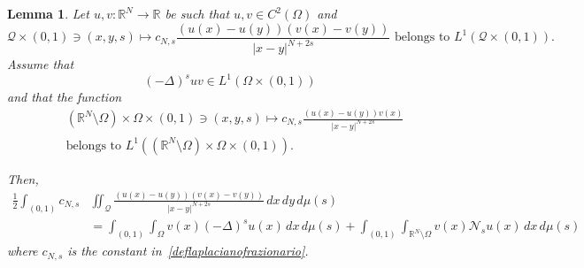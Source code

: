 \documentclass[12pt,a4paper,intlimits,sumlimits]{amsart}
\def \R {\mathbb{R}}
\def \Ns {\mathscr{N}_{s}}
\def \Q {\mathcal Q}
\theoremstyle{definition}
\theoremstyle{plain}
\newtheorem{lemma}[definition]{Lemma}
\numberwithin{equation}{section}
\begin{document}
\begin{lemma}\label{lemmaperparti}
Let $u,v:\R^N\to \R$ be such that
$u,v\in C^2(\Omega)$ and
\begin{equation}\label{ipotesiperparti1}
\Q\times(0,1)\ni (x,y,s) \mapsto 
c_{N,s}\frac{(u(x)-u(y))(v(x)-v(y))}{|x-y|^{N+2s}}
\mbox{ belongs to } L^1(\Q\times(0,1)).
\end{equation}
Assume that
\begin{equation}\label{ipotesiperparti2}
(-\Delta)^su v\in L^1(\Omega\times (0,1))
\end{equation}
and that the function
\begin{equation}\label{ipotesiperparti3}\begin{split}
&(\R^N\setminus \Omega)\times \Omega \times (0,1)\ni (x,y,s)
\mapsto c_{N,s}\frac{(u(x)-u(y))v(x)}{|x-y|^{N+2s}}\\&
\mbox{belongs to }
L^1((\R^N\setminus \Omega)\times \Omega \times(0,1)).\end{split}
\end{equation}

Then,
\begin{equation}\label{tesiperparti}
\begin{aligned}
\frac{1}{2}\int_{(0, 1)}c_{N,s}&\iint_\Q\frac{(u(x)-u(y))(v(x)-v(y))}{|x-y|^{N+2s}}\,dx\,dy\,d\mu(s) \\
&=\int_{(0, 1)} \int_\Omega v(x)(-\Delta)^su(x)\,dx\,d\mu(s)+\int_{(0, 1)}\int_{\R^N\setminus \Omega}v(x)\Ns u(x)\,dx \,d\mu(s)
\end{aligned}
\end{equation}
where $c_{N,s}$ is the constant in~\eqref{deflaplacianofrazionario}.
\end{lemma}
\end{document}
